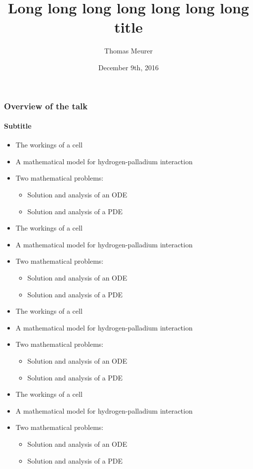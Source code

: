 \documentclass[10pt,t]{beamer}
\title{Long long long long long long long title}
\subtitle{} %
\author[T. Meurer]{Thomas Meurer}
\institute[ACON]{IFAC World Congress 2017, Toulouse (F)}
\date{December 9th, 2016}
\begin{document}
\begin{frame}[plain]
  \titlepage
\end{frame}

\begin{frame}[allowframebreaks=0.9]
  \frametitle{Overview of the talk}
  \framesubtitle{Subtitle}

  \begin{itemize}
  \item The workings of a  cell
  \item A mathematical model for hydrogen-palladium interaction
  \item Two mathematical problems:
    \begin{itemize}
    \item Solution and analysis of an ODE
    \item Solution and analysis of a PDE
    \end{itemize}
  \end{itemize}
  \begin{itemize}
  \item The workings of a  cell
  \item A mathematical model for hydrogen-palladium interaction
  \item Two mathematical problems:
    \begin{itemize}
    \item Solution and analysis of an ODE
    \item Solution and analysis of a PDE
    \end{itemize}
  \end{itemize}
  \begin{itemize}
  \item The workings of a  cell
  \item A mathematical model for hydrogen-palladium interaction
  \item Two mathematical problems:
    \begin{itemize}
    \item Solution and analysis of an ODE
    \item Solution and analysis of a PDE
    \end{itemize}
  \end{itemize} 
  \begin{itemize}
  \item The workings of a  cell
  \item A mathematical model for hydrogen-palladium interaction
  \item Two mathematical problems:
    \begin{itemize}
    \item Solution and analysis of an ODE
    \item Solution and analysis of a PDE
    \end{itemize}
  \end{itemize}
  
\end{frame}
\end{document}
